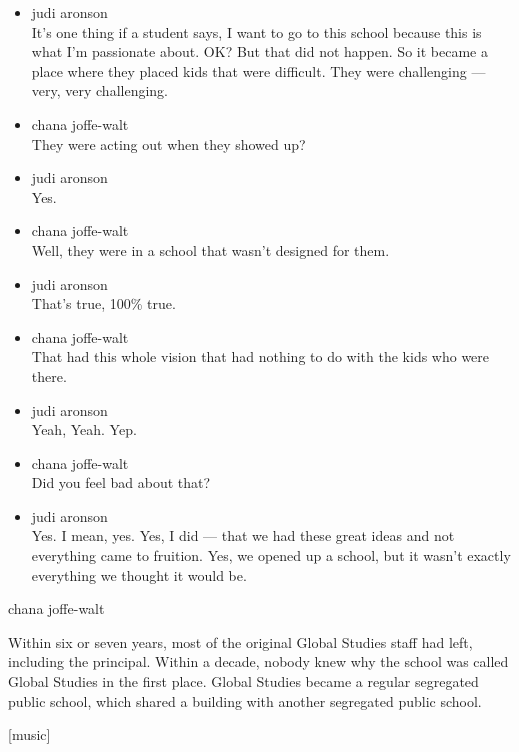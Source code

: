 \begin{itemize}
\item
  judi aronson\\
  It's one thing if a student says, I want to go to this school because
  this is what I'm passionate about. OK? But that did not happen. So it
  became a place where they placed kids that were difficult. They were
  challenging --- very, very challenging.
\item
  chana joffe-walt\\
  They were acting out when they showed up?
\item
  judi aronson\\
  Yes.
\item
  chana joffe-walt\\
  Well, they were in a school that wasn't designed for them.
\item
  judi aronson\\
  That's true, 100\% true.
\item
  chana joffe-walt\\
  That had this whole vision that had nothing to do with the kids who
  were there.
\item
  judi aronson\\
  Yeah, Yeah. Yep.
\item
  chana joffe-walt\\
  Did you feel bad about that?
\item
  judi aronson\\
  Yes. I mean, yes. Yes, I did --- that we had these great ideas and not
  everything came to fruition. Yes, we opened up a school, but it wasn't
  exactly everything we thought it would be.
\end{itemize}

chana joffe-walt

Within six or seven years, most of the original Global Studies staff had
left, including the principal. Within a decade, nobody knew why the
school was called Global Studies in the first place. Global Studies
became a regular segregated public school, which shared a building with
another segregated public school.

{[}music{]}

